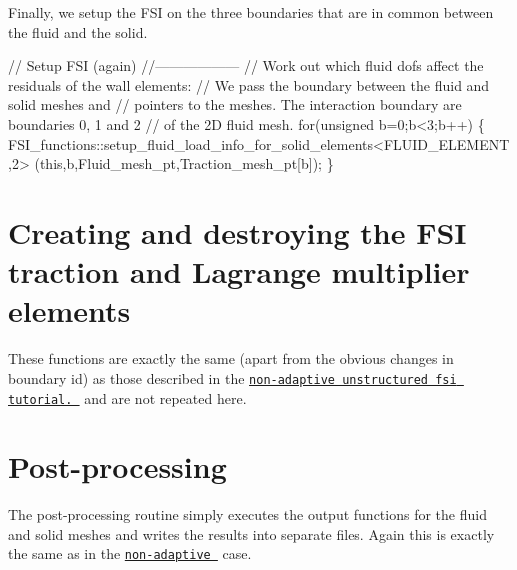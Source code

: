 Finally, we setup the F\+SI on the three boundaries that are in common between the fluid and the solid.


\begin{DoxyCodeInclude}

 \textcolor{comment}{// Setup FSI (again)}
 \textcolor{comment}{//------------------}
 \textcolor{comment}{// Work out which fluid dofs affect the residuals of the wall elements:}
 \textcolor{comment}{// We pass the boundary between the fluid and solid meshes and }
 \textcolor{comment}{// pointers to the meshes. The interaction boundary are boundaries 0, 1 and 2}
 \textcolor{comment}{// of the 2D fluid mesh.}
 \textcolor{keywordflow}{for}(\textcolor{keywordtype}{unsigned} b=0;b<3;b++)
  \{
   FSI\_functions::setup\_fluid\_load\_info\_for\_solid\_elements<FLUID\_ELEMENT,2>
    (\textcolor{keyword}{this},b,Fluid\_mesh\_pt,Traction\_mesh\_pt[b]);
  \}

\end{DoxyCodeInclude}




 

\hypertarget{index_fsi_traction}{}\section{Creating and destroying the F\+S\+I traction and Lagrange multiplier elements}\label{index_fsi_traction}
These functions are exactly the same (apart from the obvious changes in boundary id) as those described in the \href{../../unstructured_fsi/html/index.html}{\tt non-\/adaptive unstructured fsi tutorial. } and are not repeated here.



 

\hypertarget{index_doc_solution}{}\section{Post-\/processing}\label{index_doc_solution}
The post-\/processing routine simply executes the output functions for the fluid and solid meshes and writes the results into separate files. Again this is exactly the same as in the \href{../../unstructured_fsi/html/index.html}{\tt non-\/adaptive } case.



 

